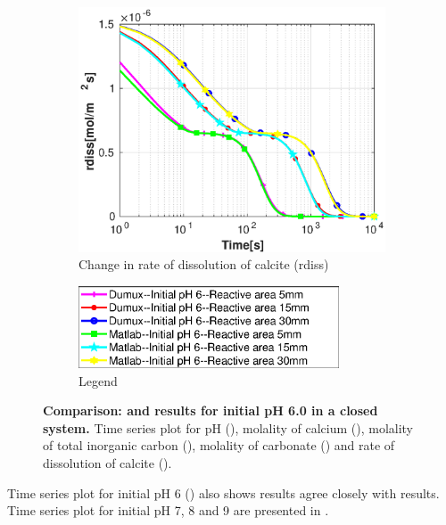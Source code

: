 \begin{figure}[!h]
\begin{subfigure}{.5\linewidth}
        \label{fig:dvmpH6mCO3}
    \end{subfigure}%
    \hfill
    \begin{subfigure}{.5\linewidth}
            \centering
        \includegraphics[width=\textwidth]{PICTURES/dvm_pH6_rdiss.eps}
        \caption{\small Change in rate of dissolution of calcite (rdiss)}
        \label{fig:dvmpH6rdiss}
    \end{subfigure}%
  \hfill
  \hfill
    \begin{subfigure}{.5\linewidth}
            \centering
        \includegraphics[width=0.85\textwidth]{PICTURES/dvm_pH6_legend.eps}
        \caption{\small Legend}
        \label{fig:dvmpH6legend}
    \end{subfigure}%
    \caption [Comparison: \DuMuX and \MATLAB results for initial pH 6.0 in a closed system.] {\textbf{ Comparison: \DuMuX and \MATLAB 
    results for initial pH 6.0 in a closed system.} \small Time series plot for pH (), 
    molality of calcium (), molality of total inorganic carbon (), 
    molality of carbonate () and rate of dissolution of calcite ().} 
    \label{fig:comparisionDumuxMatlab_pH6.0}
\end{figure}

Time series plot for initial pH 6 () also shows \MATLAB results agree closely with \DuMuX results. 
Time series plot for initial pH 7, 8 and 9 are presented in .


\endinput